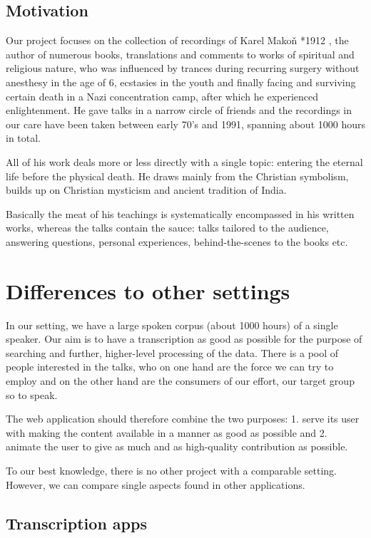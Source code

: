 \documentclass{svproc}
\begin{document}
\subsection{Motivation}

Our project focuses on the collection of recordings of Karel Mako\v{n} *1912
, the author of numerous books, translations and comments to
works of spiritual and religious nature, who was influenced by trances during
recurring surgery without anesthesy in the age of 6, ecstasies in the youth and
finally facing and surviving certain death in a Nazi concentration camp, after
which he experienced enlightenment. He gave talks in a narrow circle of friends
and the recordings in our care have been taken between early 70's and 1991,
spanning about 1000 hours in total.

All of his work deals more or less directly with a single topic: entering the
eternal life before the physical death. He draws mainly from the Christian
symbolism, builds up on Christian mysticism and ancient tradition of India.

Basically the meat of his teachings is systematically encompassed in his written
works, whereas the talks contain the sauce: talks tailored to the audience,
answering questions, personal experiences, behind-the-scenes to the books etc.

\section{Differences to other settings}

In our setting, we have a large spoken corpus (about 1000 hours) of a single
speaker. Our aim is to have a transcription as good as possible for the purpose
of searching and further, higher-level processing of the data. There is a pool
of people interested in the talks, who on one hand are the force we can try to
employ and on the other hand are the consumers of our effort, our target group
so to speak.

The web application should therefore combine the two purposes: 1. serve its user
with making the content available in a manner as good as possible and 2. animate
the user to give as much and as high-quality contribution as possible.

To our best knowledge, there is no other project with a comparable setting.
However, we can compare single aspects found in other applications.

\subsection{Transcription apps}
\end{document}
